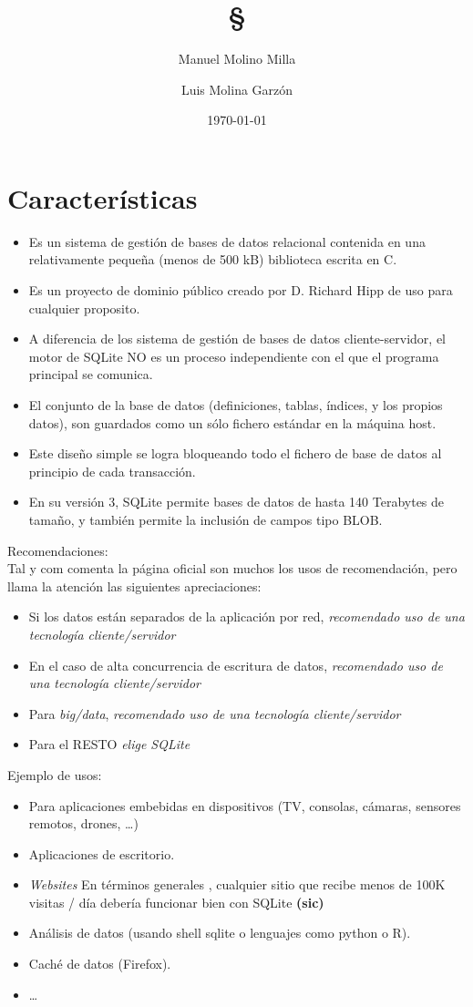 \documentclass[4paper]{article}
\author{Manuel Molino Milla \and Luis Molina Garzón}
\title{\textbf{\S}}
\date{\today}
\begin{document}
\maketitle 
\tableofcontents
\newpage

\section{Características}
\begin{itemize}
\item Es un sistema de gestión de bases de datos relacional contenida en una relativamente pequeña (menos de 500 kB) biblioteca escrita en C. 
\item Es un proyecto de dominio público creado por D. Richard Hipp de uso para cualquier proposito.
\item A diferencia de los sistema de gestión de bases de datos cliente-servidor, el motor de SQLite NO es un proceso independiente con el que el programa principal se comunica. 
\item  El conjunto de la base de datos (definiciones, tablas, índices, y los propios datos), son guardados como un sólo fichero estándar en la máquina host. 
\item Este diseño simple se logra bloqueando todo el fichero de base de datos al principio de cada transacción.
\item En su versión 3, SQLite permite bases de datos de hasta 140 Terabytes de tamaño, y también permite la inclusión de campos tipo BLOB.
\end{itemize}
Recomendaciones:\\
Tal y com comenta la página oficial son muchos los usos de recomendación, pero llama la atención las siguientes apreciaciones:
\begin{itemize}
\item Si los datos están separados de la aplicación por red, \emph{recomendado uso de una tecnología cliente/servidor}
\item En el caso de alta concurrencia de escritura de datos, \emph{recomendado uso de una tecnología cliente/servidor}
\item Para \emph{big/data}, \emph{recomendado uso de una tecnología cliente/servidor}
\item Para el RESTO \emph{elige SQLite}
\end{itemize}
Ejemplo de usos:
\begin{itemize}
\item Para aplicaciones embebidas en dispositivos (TV, consolas, cámaras, sensores remotos, drones, \dots)
\item Aplicaciones de escritorio.
\item \emph{Websites} En términos generales , cualquier sitio que recibe menos de 100K visitas / día debería funcionar bien con SQLite \textbf{(sic)}
\item Análisis de datos (usando shell sqlite o lenguajes como python o R).
\item Caché de datos (Firefox).
\item \dots
\end{itemize}
\end{document}
